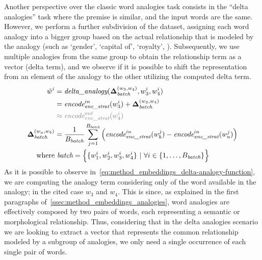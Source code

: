 Another perspective over the classic word analogies task consists in the ``delta analogies'' task where the premise is similar, and the input words are the same.
However, we perform a further subdivision of the dataset, assigning each word analogy into a bigger group based on the actual relationship that is modeled by the analogy (such as `gender', `capital of', `royalty', ).
Subsequently, we use multiple analogies from the same group to obtain the relationship term as a vector (delta term), and we observe if it is possible to shift the representation from an element of the analogy to the other utilizing the computed delta term.
\begin{equation}
    \label{eq:method_embeddings_delta-analogy-function}
    \begin{aligned}
        \tilde{w}^i &= \textit{delta\_analogy}(\gbm{\Delta}_{\textit{batch}}^{(w_3, w_4)}, w_3^i, w_4^i) \\
        &= {\textit{encode}}_{\textit{enc\_strat}}^{in}(w_3^i) + \gbm{\Delta}_{\textit{batch}}^{(w_3, w_4)} \\
        &\color{gray} \approx {\textit{encode}}_{\textit{enc\_strat}}^{out}(w_4^i) \\
        \gbm{\Delta}_{\textit{batch}}^{(w_a, w_b)} &= \frac{1}{B_{\textit{batch}}}\sum_{j=1}^{B_{\textit{batch}}}{\Bigl({\textit{encode}}_{\textit{enc\_strat}}^{in}(w_b^j) - {\textit{encode}}_{\textit{enc\_strat}}^{in}(w_a^j)\Bigr)} \\
        \text{where}&\ \textit{batch} = \Bigl\{ \{w_1^i, w_2^i, w_3^i, w_4^i\} \ |\ \forall i \in \{1,\ldots, B_{\textit{batch}}\} \Bigr\}
    \end{aligned}
\end{equation}
As it is possible to observe in~\cref{eq:method_embeddings_delta-analogy-function}, we are computing the analogy term considering only  of the word available in the analogy; in the cited case $w_3$ and $w_4$.
This is  since, as explained in the first paragraphs of~\cref{ssec:method_embeddings_analogies}, word analogies are effectively composed by two pairs of words, each representing a semantic or morphological relationship.
Thus, considering that in the delta analogies scenario we are looking to extract a vector that represents the common relationship modeled by a subgroup of analogies, we only need a single occurrence of each single pair of words.


